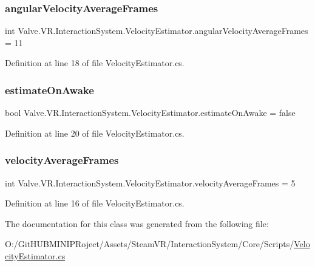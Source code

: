 \subsubsection{\texorpdfstring{angularVelocityAverageFrames}{angularVelocityAverageFrames}}
{\footnotesize\ttfamily int Valve.\+V\+R.\+Interaction\+System.\+Velocity\+Estimator.\+angular\+Velocity\+Average\+Frames = 11}



Definition at line 18 of file Velocity\+Estimator.\+cs.

\mbox{\label{class_valve_1_1_v_r_1_1_interaction_system_1_1_velocity_estimator_a6f41731474b7149756386f9daef4ab1a}} 
\subsubsection{\texorpdfstring{estimateOnAwake}{estimateOnAwake}}
{\footnotesize\ttfamily bool Valve.\+V\+R.\+Interaction\+System.\+Velocity\+Estimator.\+estimate\+On\+Awake = false}



Definition at line 20 of file Velocity\+Estimator.\+cs.

\mbox{\label{class_valve_1_1_v_r_1_1_interaction_system_1_1_velocity_estimator_a838dbedcb8be448e4c2224296b3b2622}} 
\subsubsection{\texorpdfstring{velocityAverageFrames}{velocityAverageFrames}}
{\footnotesize\ttfamily int Valve.\+V\+R.\+Interaction\+System.\+Velocity\+Estimator.\+velocity\+Average\+Frames = 5}



Definition at line 16 of file Velocity\+Estimator.\+cs.



The documentation for this class was generated from the following file\+:\begin{DoxyCompactItemize}
\item 
O\+:/\+Git\+H\+U\+B\+M\+I\+N\+I\+P\+Roject/\+Assets/\+Steam\+V\+R/\+Interaction\+System/\+Core/\+Scripts/\mbox{\hyperlink{_velocity_estimator_8cs}{Velocity\+Estimator.\+cs}}\end{DoxyCompactItemize}
